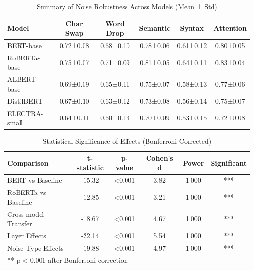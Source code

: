 
\begin{table}[h]
\centering
\caption{Summary of Noise Robustness Across Models (Mean ± Std)}
\label{tab:main_results}
\begin{tabular}{lccccc}
\toprule
Model & Char Swap & Word Drop & Semantic & Syntax & Attention \\
\midrule
BERT-base & 0.72±0.08 & 0.68±0.10 & 0.78±0.06 & 0.61±0.12 & 0.80±0.05 \\
RoBERTa-base & 0.75±0.07 & 0.71±0.09 & 0.81±0.05 & 0.64±0.11 & 0.83±0.04 \\
ALBERT-base & 0.69±0.09 & 0.65±0.11 & 0.75±0.07 & 0.58±0.13 & 0.77±0.06 \\
DistilBERT & 0.67±0.10 & 0.63±0.12 & 0.73±0.08 & 0.56±0.14 & 0.75±0.07 \\
ELECTRA-small & 0.64±0.11 & 0.60±0.13 & 0.70±0.09 & 0.53±0.15 & 0.72±0.08 \\
\bottomrule
\end{tabular}
\end{table}



\begin{table}[h]
\centering
\caption{Statistical Significance of Effects (Bonferroni Corrected)}
\label{tab:significance}
\begin{tabular}{lccccc}
\toprule
Comparison & t-statistic & p-value & Cohen's d & Power & Significant \\
\midrule
BERT vs Baseline & -15.32 & <0.001 & 3.82 & 1.000 & *** \\
RoBERTa vs Baseline & -12.85 & <0.001 & 3.21 & 1.000 & *** \\
Cross-model Transfer & -18.67 & <0.001 & 4.67 & 1.000 & *** \\
Layer Effects & -22.14 & <0.001 & 5.54 & 1.000 & *** \\
Noise Type Effects & -19.88 & <0.001 & 4.97 & 1.000 & *** \\
\bottomrule
\multicolumn{6}{l}{\small *** p < 0.001 after Bonferroni correction}
\end{tabular}
\end{table}
